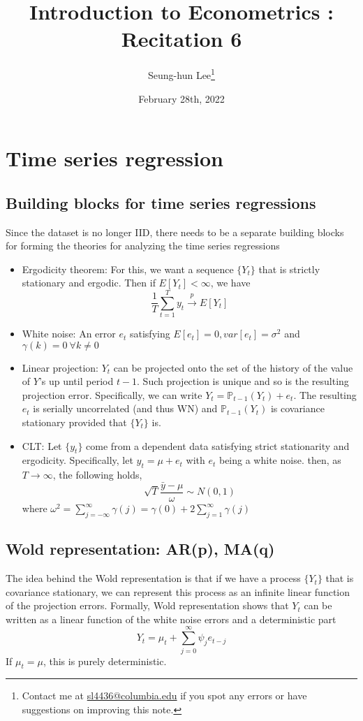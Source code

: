 \documentclass[12pt]{article}
\title{Introduction to Econometrics \ROM{2}: Recitation 6}
\theoremstyle{definition}
\theoremstyle{property}
\theoremstyle{assumption}
\theoremstyle{example}
\theoremstyle{comment}
\begin{document}
\linespread{1.25}
\onehalfspacing

\author{Seung-hun Lee\footnote{Contact me at \href{mailto:sl4436@columbia.edu}{sl4436@columbia.edu} if you spot any errors or have suggestions on improving this note.}}
\date{February 28th, 2022}
\maketitle
\thispagestyle{firstpage}

\section{Time series regression}
\subsection{Building blocks for time series regressions}
Since the dataset is no longer IID, there needs to be a separate building blocks for forming the theories for analyzing the time series regressions
\begin{itemize}
\item Ergodicity theorem: For this, we want a sequence $\{Y_t\}$ that is strictly stationary and ergodic. Then if $E[Y_t]<\infty$, we have
\[
\frac{1}{T}\sum_{t=1}^Ty_t  \xrightarrow{p} E[Y_t]
\]
\item White noise: An error $e_t$ satisfying $E[e_t]=0, var[e_t]=\sigma^2$ and $\gamma(k)=0 \ \forall k\neq0$
\item Linear projection: $Y_t$ can be projected onto the set  of the history of the value of $Y$'s up until period $t-1$. Such projection is unique and so is the resulting projection error. Specifically, we can write $Y_t = \mathbb{P}_{t-1}(Y_t)+e_t$.  The resulting $e_t$ is serially uncorrelated (and thus WN) and $\mathbb{P}_{t-1}(Y_t)$ is covariance stationary provided that $\{Y_t\}$ is.
\item CLT: Let $\{y_t\}$ come from a dependent data satisfying strict stationarity and ergodicity. Specifically, let $y_t = \mu + e_t$ with $e_t$ being a white noise. then, as $T\to\infty$, the following holds, 
\[
\sqrt{T}\frac{\bar{y}-\mu}{\omega}\sim N(0,1)
\]
where $\omega^2= \sum_{j=-\infty}^\infty \gamma(j)=\gamma(0)+2\sum_{j=1}^\infty \gamma(j)$

\end{itemize}
\subsection{Wold representation: AR(p), MA(q)}
The idea behind the Wold representation is that if we have a process $\{Y_t\}$ that is covariance stationary, we can represent this process as an infinite linear function of the projection errors. Formally, Wold representation shows that $Y_t$ can be written as  a linear function of the white noise errors and a deterministic part
\[
Y_t = \mu_t + \sum_{j=0}^\infty \psi_je_{t-j}
\]
If $\mu_t=\mu$, this is purely deterministic. 
\end{document}
